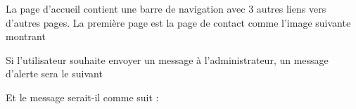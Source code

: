 \documentclass{article}
\begin{document}
\begin{enumerate}
   La page d'accueil contient une barre de navigation avec 3 autres liens vers d'autres pages.
La première page est la page de contact comme l'image suivante montrant
  
\vspace{0.7cm}
   

   \hspace*{-0.7in}
               \noindent{} 
               
               
Si l'utilisateur souhaite envoyer un message à l'administrateur, un message d'alerte sera le suivant
  
  
  \vspace{0.7cm}
               \hspace*{-0.7in}
               \noindent{} 
  
  
  Et le message serait-il comme suit :
 

\end{enumerate}
\end{document}
